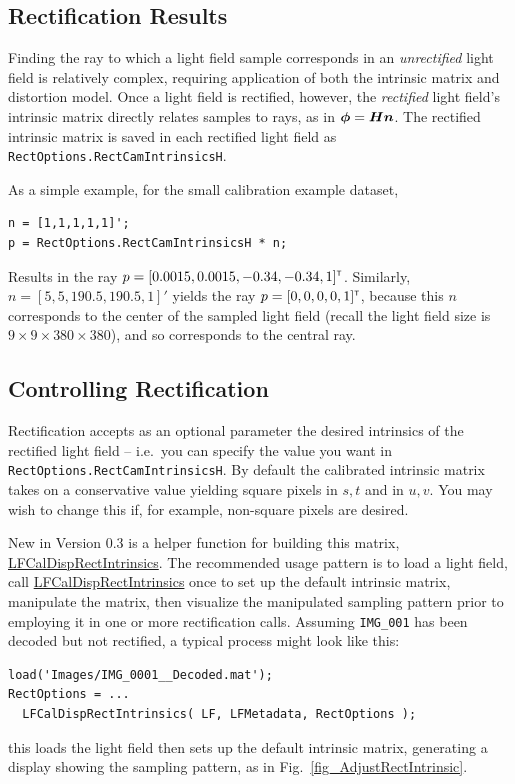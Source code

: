 \documentclass[onecolumn]{article}
\newcommand{\CiteFunction}[1]{\hyperlink{#1}{\small #1}}
\newcommand{\SymbolText}[1]{\texttt{\small #1}}
\begin{document}
\subsection{Rectification Results}

Finding the ray to which a light field sample corresponds in an \emph{unrectified} light field is relatively complex, requiring application of both the intrinsic matrix and distortion model.  Once a light field is rectified, however, the \emph{rectified} light field's intrinsic matrix directly relates samples to rays, as in $\vect{\phi} = \mat{H} \vect{n}$.  The rectified intrinsic matrix is saved in each rectified light field as \SymbolText{RectOptions.RectCamIntrinsicsH}.

As a simple example, for the small calibration example dataset,
\begin{Verbatim}
n = [1,1,1,1,1]';
p = RectOptions.RectCamIntrinsicsH * n;
\end{Verbatim}

Results in the ray $p = [0.0015,0.0015, -0.34,-0.34, 1]^{\scriptscriptstyle\mathsf{T}}$. Similarly,\\ $n = [5,5,190.5,190.5,1]'$ yields the ray $p = [0,0,0,0,1]^{\scriptscriptstyle\mathsf{T}}$, because this $n$ corresponds to the center of the sampled light field (recall the light field size is $9 \times 9 \times 380 \times 380$), and so corresponds to the central ray.

\subsection{Controlling Rectification}

Rectification accepts as an optional parameter the desired intrinsics of the rectified light field -- i.e.\ you can specify the value you want in \SymbolText{RectOptions.RectCamIntrinsicsH}.  By default the calibrated intrinsic matrix takes on a conservative value yielding square pixels in $s,t$ and in $u,v$.  You may wish to change this if, for example, non-square pixels are desired.

New in Version 0.3 is a helper function for building this matrix, \CiteFunction{LFCalDispRectIntrinsics}.  The recommended usage pattern is to load a light field, call \CiteFunction{LFCalDispRectIntrinsics} once to set up the default intrinsic matrix, manipulate the matrix, then visualize the manipulated sampling pattern prior to employing it in one or more rectification calls.  Assuming \SymbolText{IMG\_001} has been decoded but not rectified, a typical process might look like this:
\begin{Verbatim}
load('Images/IMG_0001__Decoded.mat');
RectOptions = ...
  LFCalDispRectIntrinsics( LF, LFMetadata, RectOptions );
\end{Verbatim}
this loads the light field then sets up the default intrinsic matrix, generating a display showing the sampling pattern, as in Fig.~\ref{fig_AdjustRectIntrinsic}.
\end{document}
